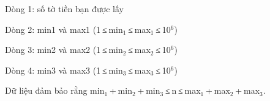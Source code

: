 Dòng 1: số tờ tiền bạn được lấy

Dòng 2: min1 và max1 (1 ≤ min$_1$ ≤ max$_1$ ≤ 10$^6$)

Dòng 3: min2 và max2 (1 ≤ min$_2$ ≤ max$_2$ ≤ 10$^6$)

Dòng 4: min3 và max3 (1 ≤ min$_3$ ≤ max$_3$ ≤ 10$^6$)

Dữ liệu đảm bảo rằng min$_1$ + min$_2$ + min$_3$ ≤ n ≤ max$_1$ + max$_2$ + max$_3$.